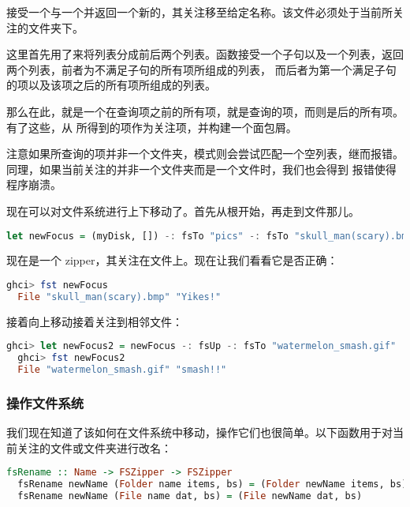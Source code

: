 \documentclass[./main.tex]{subfiles}
\begin{document}
接受一个与一个并返回一个新的，其关注移至给定名称。该文件必须处于当前所关注的文件夹下。

这里首先用了来将列表分成前后两个列表。函数接受一个子句以及一个列表，返回两个列表，前者为不满足子句的所有项所组成的列表，
而后者为第一个满足子句的项以及该项之后的所有项所组成的列表。

那么在此，就是一个在查询项之前的所有项，就是查询的项，而则是后的所有项。有了这些，从
所得到的项作为关注项，并构建一个面包屑。

注意如果所查询的项并非一个文件夹，模式则会尝试匹配一个空列表，继而报错。同理，如果当前关注的并非一个文件夹而是一个文件时，我们也会得到
报错使得程序崩溃。

现在可以对文件系统进行上下移动了。首先从根开始，再走到文件那儿。

\begin{lstlisting}[language=Haskell]
  let newFocus = (myDisk, []) -: fsTo "pics" -: fsTo "skull_man(scary).bmp"
\end{lstlisting}

现在是一个 zipper，其关注在文件上。现在让我们看看它是否正确：

\begin{lstlisting}[language=Haskell]
  ghci> fst newFocus
  File "skull_man(scary).bmp" "Yikes!"
\end{lstlisting}

接着向上移动接着关注到相邻文件：

\begin{lstlisting}[language=Haskell]
  ghci> let newFocus2 = newFocus -: fsUp -: fsTo "watermelon_smash.gif"
  ghci> fst newFocus2
  File "watermelon_smash.gif" "smash!!"
\end{lstlisting}

\subsubsection*{操作文件系统}

我们现在知道了该如何在文件系统中移动，操作它们也很简单。以下函数用于对当前关注的文件或文件夹进行改名：

\begin{lstlisting}[language=Haskell]
  fsRename :: Name -> FSZipper -> FSZipper
  fsRename newName (Folder name items, bs) = (Folder newName items, bs)
  fsRename newName (File name dat, bs) = (File newName dat, bs)
\end{lstlisting}
\end{document}
